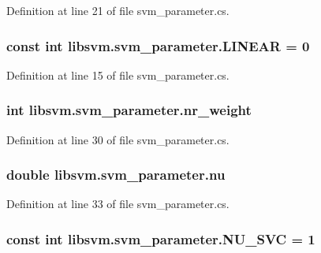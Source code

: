 Definition at line 21 of file svm\_\-parameter.cs.

\hypertarget{classlibsvm_1_1svm__parameter_ab7e7db4ec8af501a4d47aca15573c4b7}{
\subsubsection[{LINEAR}]{\setlength{\rightskip}{0pt plus 5cm}const int {\bf libsvm.svm\_\-parameter.LINEAR} = 0}}
\label{classlibsvm_1_1svm__parameter_ab7e7db4ec8af501a4d47aca15573c4b7}


Definition at line 15 of file svm\_\-parameter.cs.

\hypertarget{classlibsvm_1_1svm__parameter_a2a36d1565cbc0106f87f0c9abed6c3fa}{
\subsubsection[{nr\_\-weight}]{\setlength{\rightskip}{0pt plus 5cm}int {\bf libsvm.svm\_\-parameter.nr\_\-weight}}}
\label{classlibsvm_1_1svm__parameter_a2a36d1565cbc0106f87f0c9abed6c3fa}


Definition at line 30 of file svm\_\-parameter.cs.

\hypertarget{classlibsvm_1_1svm__parameter_a373b74244ae284fc4a6db91f1200902d}{
\subsubsection[{nu}]{\setlength{\rightskip}{0pt plus 5cm}double {\bf libsvm.svm\_\-parameter.nu}}}
\label{classlibsvm_1_1svm__parameter_a373b74244ae284fc4a6db91f1200902d}


Definition at line 33 of file svm\_\-parameter.cs.

\hypertarget{classlibsvm_1_1svm__parameter_a0af329ff5d9af7ce423d9e04180bf0a3}{
\subsubsection[{NU\_\-SVC}]{\setlength{\rightskip}{0pt plus 5cm}const int {\bf libsvm.svm\_\-parameter.NU\_\-SVC} = 1}}
\label{classlibsvm_1_1svm__parameter_a0af329ff5d9af7ce423d9e04180bf0a3}


